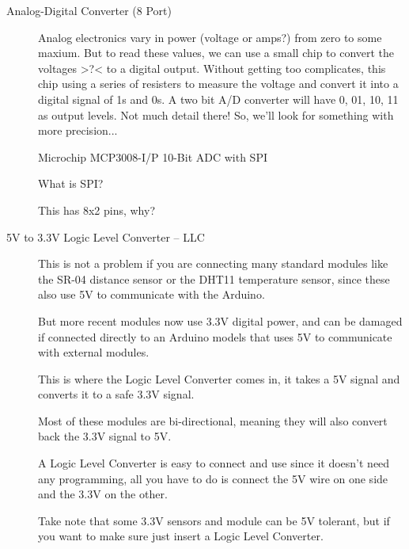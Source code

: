 \documentclass{article}\usepackage[]{graphicx}\usepackage[]{color}
\begin{document}
\begin{description}
\item[Analog-Digital Converter (8 Port)] Analog electronics vary in power (voltage or amps?) from zero to some maxium. But to read these values, we can use a small chip to convert the voltages >?< to a digital output. Without getting too complicates, this chip using a series of resisters to measure the voltage and convert it into a digital signal of 1s and 0s. A two bit A/D converter will have 0, 01, 10, 11 as output levels. Not much detail there!  So, we'll look for something with more precision...

Microchip MCP3008-I/P 10-Bit ADC with SPI  

What is SPI?

This has 8x2 pins, why?

\item[5V to 3.3V Logic Level Converter -- LLC] This is not a problem if you are connecting many standard modules like the SR-04 distance sensor or the DHT11 temperature sensor, since these also use 5V to communicate with the Arduino.

But more recent modules now use 3.3V digital power, and can be damaged if connected directly to an Arduino models that uses 5V to communicate with external modules.

This is where the Logic Level Converter comes in, it takes a 5V signal and converts it to a safe 3.3V signal.

Most of these modules are bi-directional, meaning they will also convert back the 3.3V signal to 5V.

A Logic Level Converter is easy to connect and use since it doesn’t need any programming, all you have to do is connect the 5V wire on one side and the 3.3V on the other.

Take note that some 3.3V sensors and module can be 5V tolerant, but if you want to make sure just insert a Logic Level Converter.


\end{description}
\end{document}
